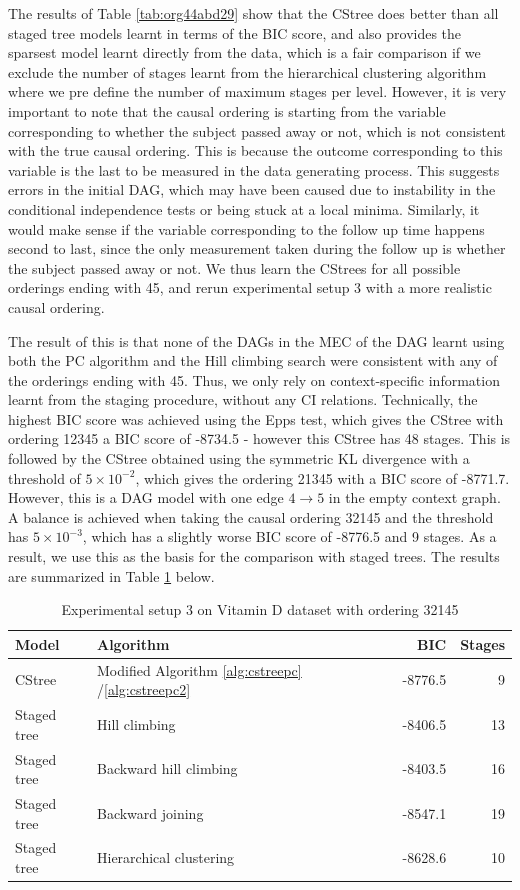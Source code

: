 \documentclass{tufte-book}
\begin{document}
The results of Table \ref{tab:org44abd29} show that the CStree does better than all staged tree models learnt in terms of the BIC score, and also provides the sparsest model learnt directly from the data, which is a fair comparison if we exclude the number of stages learnt from the hierarchical clustering algorithm where we pre define the number of maximum stages per level. However, it is very important to note that the causal ordering is starting from the variable corresponding to whether the subject passed away or not, which is not consistent with the true causal ordering. This is because the outcome corresponding to this variable is the last to be measured in the data generating process. This suggests errors in the initial DAG, which may have been caused due to instability in the conditional independence tests or being stuck at a local minima. Similarly, it would make sense if the variable corresponding to the follow up time happens second to last, since the only measurement taken during the follow up is whether the subject passed away or not. We thus learn the CStrees for all possible orderings ending with 45, and rerun experimental setup 3 with a more realistic causal ordering.

The result of this is that none of the DAGs in the MEC of the DAG learnt using both the PC algorithm and the Hill climbing search were consistent with any of the orderings ending with 45. Thus, we only rely on context-specific information learnt from the staging procedure, without any CI relations. Technically, the highest BIC score was achieved using the Epps test, which gives the CStree with ordering 12345 a BIC score of -8734.5 - however this CStree has 48 stages. This is followed by the CStree obtained using the symmetric KL divergence with a threshold of \(5 \times 10^{-2}\), which gives the ordering 21345 with a BIC score of -8771.7. However, this is a DAG model with one edge \(4 \rightarrow 5\) in the empty context graph. A balance is achieved when taking the causal ordering 32145 and the threshold has \(5 \times 10^{-3}\), which has a slightly worse BIC score of -8776.5 and 9 stages. As a result, we use this as the basis for the comparison with staged trees. The results are summarized in Table \ref{tab:org40b7225} below.


\begin{table}[htbp]
\caption{\label{tab:org40b7225}Experimental setup 3 on Vitamin D dataset with ordering 32145}
\centering
\begin{tabular}{l|l|r|r}
\hline
Model & Algorithm & BIC & Stages\\
\hline
CStree & Modified Algorithm \ref{alg:cstreepc} /\ref{alg:cstreepc2} & -8776.5 & 9\\
Staged tree & Hill climbing & -8406.5 & 13\\
Staged tree & Backward hill climbing & -8403.5 & 16\\
Staged tree & Backward joining & -8547.1 & 19\\
Staged tree & Hierarchical clustering & -8628.6 & 10\\
\end{tabular}
\end{table}
\end{document}
